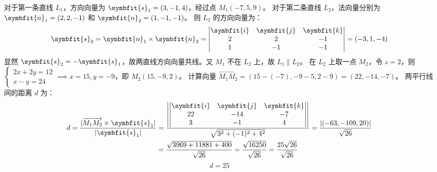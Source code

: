 \begin{solution}
    对于第一条直线 $L_1$，方向向量为 $\symbfit{s}_1 = (3, -1, 4)$，经过点 $M_1(-7, 5, 9)$。
    对于第二条直线 $L_2$，法向量分别为 $\symbfit{n}_1 = (2, 2, -1)$ 和 $\symbfit{n}_2 = (1, -1, -1)$。
    则 $L_2$ 的方向向量为：
    \begin{equation}
        \symbfit{s}_2 = \symbfit{n}_1 \times \symbfit{n}_2 = \begin{vmatrix} \symbfit{i} & \symbfit{j} & \symbfit{k} \\ 2 & 2 & -1 \\ 1 & -1 & -1 \end{vmatrix} = (-3, 1, -4)
    \end{equation}
    显然 $\symbfit{s}_2 = - \symbfit{s}_1$，故两直线方向向量共线。又 $M_1$ 不在 $L_2$ 上，故 $L_1 \parallel L_2$。
    在 $L_2$ 上取一点 $M_2$，令 $z=2$，则 $\begin{cases} 2x+2y=12 \\ x-y=24 \end{cases} \implies x=15, y=-9$，即 $M_2(15, -9, 2)$。
    计算向量 $\overrightarrow{M_1 M_2} = (15 - (-7), -9 - 5, 2 - 9) = (22, -14, -7)$。
    两平行线间的距离 $d$ 为：
    \begin{equation}
        \begin{aligned}
            d = \frac{|\overrightarrow{M_1 M_2} \times \symbfit{s}_1|}{|\symbfit{s}_1|} & = \frac{\left| \begin{vmatrix} \symbfit{i} & \symbfit{j} & \symbfit{k} \\ 22 & -14 & -7 \\ 3 & -1 & 4 \end{vmatrix} \right|}{\sqrt{3^2 + (-1)^2 + 4^2}} = \frac{|(-63, -109, 20)|}{\sqrt{26}} \\
                                                                                        & = \frac{\sqrt{3969 + 11881 + 400}}{\sqrt{26}} = \frac{\sqrt{16250}}{\sqrt{26}} = \frac{25\sqrt{26}}{\sqrt{26}}
        \end{aligned}
    \end{equation}
    \begin{equation}
        \boxed{d = 25}
    \end{equation}
\end{solution}


